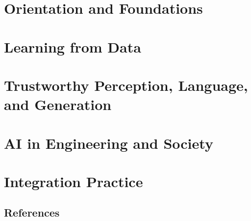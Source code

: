 


\frontmatter

\tableofcontents
\clearpage
\listoffigures
\clearpage
\listoftables

\mainmatter
\part{Orientation and Foundations}





\part{Learning from Data}





\part{Trustworthy Perception, Language, and Generation}





\part{AI in Engineering and Society}











\part{Integration Practice}


\appendix


\backmatter
\chapter{References}
\printbibliography[heading=none]

